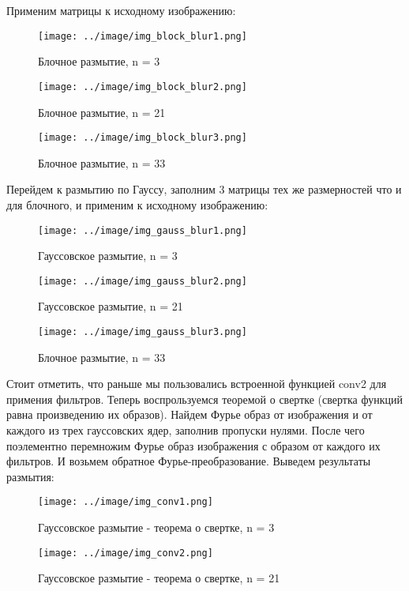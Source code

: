 \noindent Применим матрицы к исходному изображению: 
\begin{figure}[!htb]
    \centering
    \texttt{[image: ../image/img\_block\_blur1.png]}   
    \caption{Блочное размытие, n = 3}
\end{figure}
\newpage 
\begin{figure}[!htb]
    \centering
    \texttt{[image: ../image/img\_block\_blur2.png]}   
    \caption{Блочное размытие, n = 21}
\end{figure}
\begin{figure}[!htb]
    \centering
    \texttt{[image: ../image/img\_block\_blur3.png]}   
    \caption{Блочное размытие, n = 33}
\end{figure}

\noindent Перейдем к размытию по Гауссу, заполним 3 матрицы тех же размерностей что и для блочного, и применим к исходному изображению:
\begin{figure}[!htb]
    \centering
    \texttt{[image: ../image/img\_gauss\_blur1.png]}   
    \caption{Гауссовское размытие, n = 3}
\end{figure}
\newpage 
\begin{figure}[!htb]
    \centering
    \texttt{[image: ../image/img\_gauss\_blur2.png]}   
    \caption{Гауссовское размытие, n = 21}
\end{figure}
\newpage
\begin{figure}[!htb]
    \centering
    \texttt{[image: ../image/img\_gauss\_blur3.png]}   
    \caption{Блочное размытие, n = 33}
\end{figure}

\noindent Стоит отметить, что раньше мы пользовались встроенной функцией conv2 для примения фильтров. Теперь воспрользуемся теоремой о свертке (свертка функций равна произведению их образов). Найдем Фурье образ от изображения и от каждого из трех гауссовских ядер, заполнив пропуски нулями. После чего поэлементно перемножим Фурье образ изображения с образом от каждого их фильтров. И возьмем обратное Фурье-преобразование. Выведем результаты размытия: 


\begin{figure}[!htb]
    \centering
    \texttt{[image: ../image/img\_conv1.png]}   
    \caption{Гауссовское размытие - теорема о свертке, n = 3}
\end{figure}
\newpage 
\begin{figure}[!htb]
    \centering
    \texttt{[image: ../image/img\_conv2.png]}   
    \caption{Гауссовское размытие - теорема о свертке, n = 21}
\end{figure}

